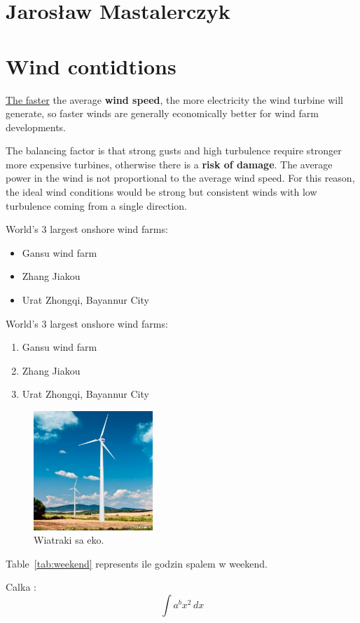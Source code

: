 \section{Jarosław Mastalerczyk}

\section*{Wind contidtions}




\begin{flushleft}
\underline{The faster} the average \textbf{wind speed}, the more electricity the wind turbine will generate, so faster winds are generally economically better for wind farm developments. \par
The balancing factor is that strong gusts and high turbulence require stronger more expensive turbines, otherwise there is a \textbf{risk of damage}. The average power in the wind is not proportional to the average wind speed. For this reason, the ideal wind conditions would be strong but consistent winds with low turbulence coming from a single direction. \par
\end{flushleft}


World's 3 largest onshore wind farms:
\begin{itemize}
  \item Gansu wind farm
  \item Zhang Jiakou
  \item Urat Zhongqi, Bayannur City
\end{itemize}


World's 3 largest onshore wind farms:
\begin{enumerate}
  \item Gansu wind farm
  \item Zhang Jiakou
  \item Urat Zhongqi, Bayannur City
\end{enumerate}

\begin{figure}[htbp]
    \centering
    \includegraphics[width=0.4\textwidth]{pictures/wiatrak.jpg} 
    \caption{Wiatraki sa eko.}
    \label{fig: wiatrak}
\end{figure}



Table~\ref{tab:weekend} represents ile godzin spalem w weekend.







Calka : \[ \int{a}^{b} x^2 \,dx \]